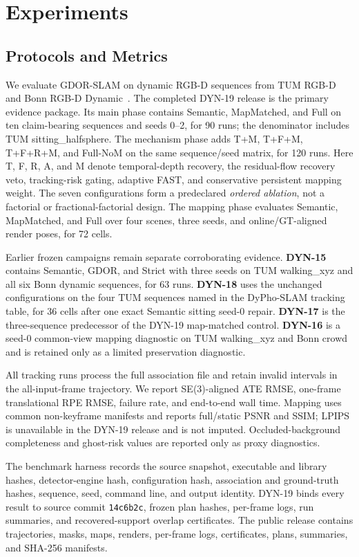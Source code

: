 \section{Experiments}
\label{sec:experiments}

\subsection{Protocols and Metrics}

We evaluate GDOR-SLAM on dynamic RGB-D sequences from TUM RGB-D~\cite{sturm2012benchmark} and Bonn RGB-D Dynamic~\cite{palazzolo2019bonn}.
The completed DYN-19 release is the primary evidence package.
Its main phase contains Semantic, MapMatched, and Full on ten claim-bearing sequences and seeds 0--2, for 90 runs; the denominator includes TUM sitting\_halfsphere.
The mechanism phase adds T+M, T+F+M, T+F+R+M, and Full-NoM on the same sequence/seed matrix, for 120 runs.
Here T, F, R, A, and M denote temporal-depth recovery, the residual-flow recovery veto, tracking-risk gating, adaptive FAST, and conservative persistent mapping weight.
The seven configurations form a predeclared \emph{ordered ablation}, not a factorial or fractional-factorial design.
The mapping phase evaluates Semantic, MapMatched, and Full over four scenes, three seeds, and online/GT-aligned render poses, for 72 cells.

Earlier frozen campaigns remain separate corroborating evidence.
\textbf{DYN-15} contains Semantic, GDOR, and Strict with three seeds on TUM walking\_xyz and all six Bonn dynamic sequences, for 63 runs.
\textbf{DYN-18} uses the unchanged configurations on the four TUM sequences named in the DyPho-SLAM tracking table, for 36 cells after one exact Semantic sitting seed-0 repair.
\textbf{DYN-17} is the three-sequence predecessor of the DYN-19 map-matched control.
\textbf{DYN-16} is a seed-0 common-view mapping diagnostic on TUM walking\_xyz and Bonn crowd and is retained only as a limited preservation diagnostic.

All tracking runs process the full association file and retain invalid intervals in the all-input-frame trajectory.
We report SE(3)-aligned ATE RMSE, one-frame translational RPE RMSE, failure rate, and end-to-end wall time.
Mapping uses common non-keyframe manifests and reports full/static PSNR and SSIM; LPIPS is unavailable in the DYN-19 release and is not imputed.
Occluded-background completeness and ghost-risk values are reported only as proxy diagnostics.

The benchmark harness records the source snapshot, executable and library hashes, detector-engine hash, configuration hash, association and ground-truth hashes, sequence, seed, command line, and output identity.
DYN-19 binds every result to source commit \texttt{14c6b2c}, frozen plan hashes, per-frame logs, run summaries, and recovered-support overlap certificates.
The public release contains trajectories, masks, maps, renders, per-frame logs, certificates, plans, summaries, and SHA-256 manifests.

